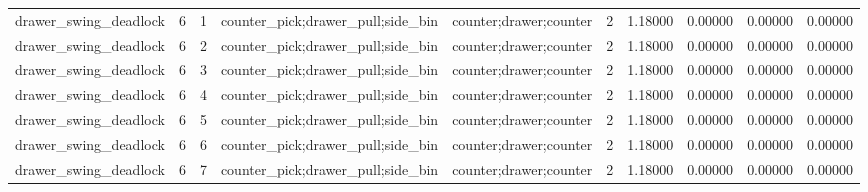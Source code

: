\documentclass{article}
\begin{document}
\begin{table}[tbp]
{\begin{tabular}{llllllllll}
drawer\_swing\_deadlock & 6 & 1 & counter\_pick;drawer\_pull;side\_bin & counter;drawer;counter & 2 & 1.18000 & 0.00000 & 0.00000 & 0.00000 \\
drawer\_swing\_deadlock & 6 & 2 & counter\_pick;drawer\_pull;side\_bin & counter;drawer;counter & 2 & 1.18000 & 0.00000 & 0.00000 & 0.00000 \\
drawer\_swing\_deadlock & 6 & 3 & counter\_pick;drawer\_pull;side\_bin & counter;drawer;counter & 2 & 1.18000 & 0.00000 & 0.00000 & 0.00000 \\
drawer\_swing\_deadlock & 6 & 4 & counter\_pick;drawer\_pull;side\_bin & counter;drawer;counter & 2 & 1.18000 & 0.00000 & 0.00000 & 0.00000 \\
drawer\_swing\_deadlock & 6 & 5 & counter\_pick;drawer\_pull;side\_bin & counter;drawer;counter & 2 & 1.18000 & 0.00000 & 0.00000 & 0.00000 \\
drawer\_swing\_deadlock & 6 & 6 & counter\_pick;drawer\_pull;side\_bin & counter;drawer;counter & 2 & 1.18000 & 0.00000 & 0.00000 & 0.00000 \\
drawer\_swing\_deadlock & 6 & 7 & counter\_pick;drawer\_pull;side\_bin & counter;drawer;counter & 2 & 1.18000 & 0.00000 & 0.00000 & 0.00000 \\
\bottomrule
\end{tabular}
}
\end{table}

\clearpage
\end{document}
